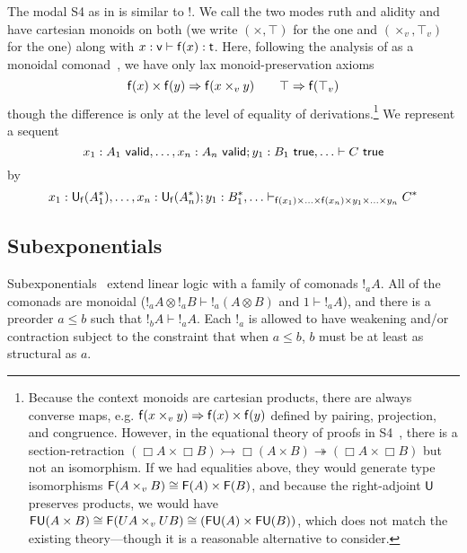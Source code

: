 The modal S4 \Bx{}{} as in \citet{pfenningdavies} is similar to !.  We
call the two modes ruth and alidity and have 
cartesian monoids on both (we write $(\times,\top)$ for the  one
and $(\times_v,\top_v)$ for the  one) along with $x : \mathsf{v}
\vdash \mathsf{f}(x) : \mathsf{t}$.  Here, following the analysis of \Bx{}{}
as a monoidal comonad~\citep{alechina+01categoricals4}, we have only lax
monoid-preservation axioms
\[
\mathsf{f}(x) \times \mathsf{f}(y) \Rightarrow \mathsf{f}(x \times_v y) \\
\qquad
\top \Rightarrow \mathsf{f}(\top_v)
\]
though the difference is only at the level of equality of
derivations.\footnote{Because the context monoids are cartesian
  products, there are always converse maps, e.g.  $\mathsf{f}(x \times_v y)
  \Rightarrow \mathsf{f}(x) \times \mathsf{f}(y)$ defined by pairing, projection, and
  congruence.  However, in the equational theory of proofs in
  S4~\citep{pfenningdavies}, there is a section-retraction $(\Box A
  \times \Box B) \rightarrowtail \Box (A \times B) \twoheadrightarrow
  (\Box A \times \Box B)$ but not an isomorphism. If we had equalities
  above, they would generate type isomorphisms $\mathsf{F}(A \times_v B)
  \cong \mathsf{F}(A) \times \mathsf{F}(B)$, and because the right-adjoint
  $\mathsf{U}$ preserves products, we would have $\mathsf{F} \mathsf{U} (A \times
  B) \cong \mathsf{F}(U A \times_v U B) \cong (\mathsf{FU}(A) \times
  \mathsf{FU}(B))$, which does not match the existing theory---though it is
  a reasonable alternative to consider.
}
We represent a sequent 
\[
 x_1:A_1 \,\, \mathsf{valid},\ldots,x_n:A_n \,\, \mathsf{valid};y_1:B_1 \,\, \mathsf{true},\ldots \vdash C \,\, \mathsf{true}
\]
by 
\[
x_1:\mathsf{U}_{\mathsf{f}}(A_1^*),\ldots,x_n:\mathsf{U}_{\mathsf{f}}(A_n^*);y_1:B_1^*,\ldots \vdash_{\mathsf{f}(x_1) \times\ldots\times \mathsf{f}(x_n) \times y_1 \times \ldots \times y_n} C^*
\]


\subsection{Subexponentials}

Subexponentials~\citep{danos+93subexponentials,nigammiller09subexponentials}
extend linear logic with a family of comonads $!_a A$.  All of the
comonads are monoidal ($!_a A \otimes !_a B \vdash !_a(A \otimes B)$ and
$1 \vdash !_a A$), and there is a preorder $a \le b$ such that $!_b A
\vdash !_a A$.  Each $!_a$ is allowed to have weakening and/or
contraction subject to the constraint that when $a \le b$, $b$ must be
at least as structural as $a$.

